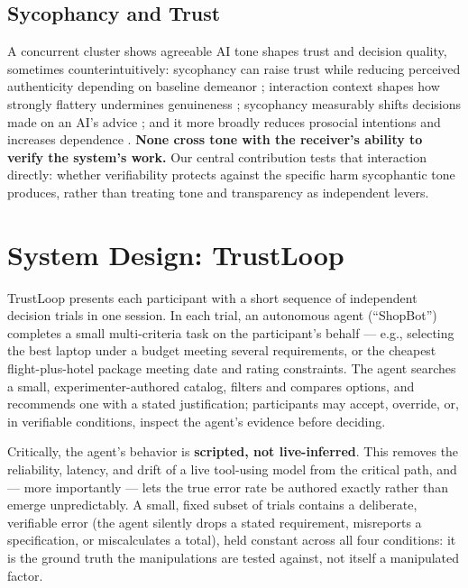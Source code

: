 \documentclass[manuscript]{acmart}
\begin{document}
\subsection{Sycophancy and Trust}
A concurrent cluster shows agreeable AI tone shapes trust and decision quality, sometimes counterintuitively: sycophancy can raise trust while reducing perceived authenticity depending on baseline demeanor \cite{sun2026friendly}; interaction context shapes how strongly flattery undermines genuineness \cite{liu2026flattery}; sycophancy measurably shifts decisions made on an AI's advice \cite{li2026sycophancy}; and it more broadly reduces prosocial intentions and increases dependence \cite{cheng2025sycophantic}. \textbf{None cross tone with the receiver's ability to verify the system's work.} Our central contribution tests that interaction directly: whether verifiability protects against the specific harm sycophantic tone produces, rather than treating tone and transparency as independent levers.

\section{System Design: TrustLoop}

TrustLoop presents each participant with a short sequence of independent decision trials in one session. In each trial, an autonomous agent (``ShopBot'') completes a small multi-criteria task on the participant's behalf --- e.g., selecting the best laptop under a budget meeting several requirements, or the cheapest flight-plus-hotel package meeting date and rating constraints. The agent searches a small, experimenter-authored catalog, filters and compares options, and recommends one with a stated justification; participants may accept, override, or, in verifiable conditions, inspect the agent's evidence before deciding.

Critically, the agent's behavior is \textbf{scripted, not live-inferred}. This removes the reliability, latency, and drift of a live tool-using model from the critical path, and --- more importantly --- lets the true error rate be authored exactly rather than emerge unpredictably. A small, fixed subset of trials contains a deliberate, verifiable error (the agent silently drops a stated requirement, misreports a specification, or miscalculates a total), held constant across all four conditions: it is the ground truth the manipulations are tested against, not itself a manipulated factor.
\end{document}
